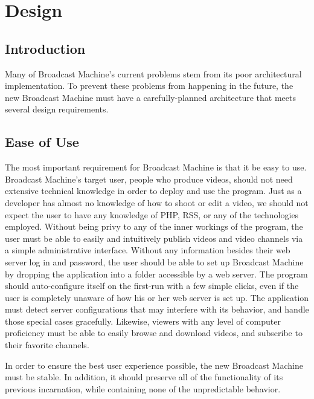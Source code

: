 \documentclass[a4paper,12pt]{report}
\begin{document}
\chapter{Design}

\section{Introduction}
Many of Broadcast Machine's current problems stem from its poor architectural implementation. 
To prevent these problems from happening in the future, the new Broadcast Machine must have a carefully-planned architecture that meets several design requirements.

\section{Ease of Use}
The most important requirement for Broadcast Machine is that it be easy to use. 
Broadcast Machine's target user, people who produce videos, should not need extensive technical knowledge in order to deploy and use the program. 
Just as a developer has almost no knowledge of how to shoot or edit a video, we should not expect the user to have any knowledge of PHP, RSS, or any of the technologies employed. 
Without being privy to any of the inner workings of the program, the user must be able to easily and intuitively publish videos and video channels via a simple administrative interface. 
Without any information besides their web server log in and password, the user should be able to set up Broadcast Machine by dropping the application into a folder accessible by a web server. 
The program should auto-configure itself on the first-run with a few simple clicks, even if the user is completely unaware of how his or her web server is set up. 
The application must detect server configurations that may interfere with its behavior, and handle those special cases gracefully. 
Likewise, viewers with any level of computer proficiency must be able to easily browse and download videos, and subscribe to their favorite channels.

In order to ensure the best user experience possible, the new Broadcast Machine must be stable. In addition, it should preserve all of the functionality of its previous incarnation, while containing none of the unpredictable behavior.
\end{document}
